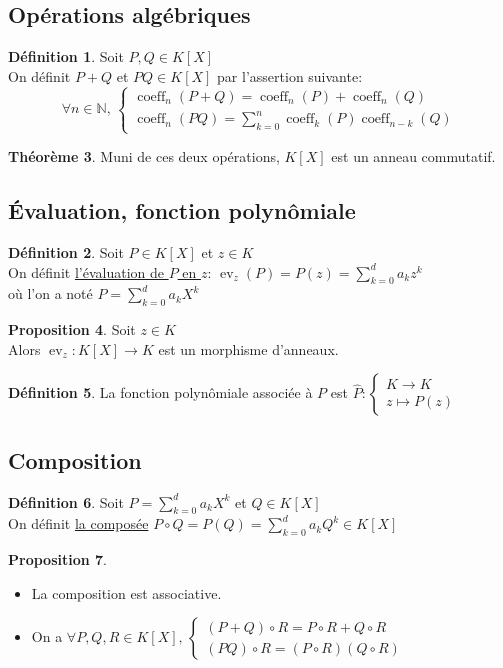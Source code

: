\documentclass[10pt,a4paper]{article}
\theoremstyle{definition}
\newtheorem{proposition}{Proposition}[section]
\newtheorem{theorem}[proposition]{Théorème}
\newtheorem{definition}[proposition]{Définition}
\DeclareMathOperator{\coeff}{coeff}
\DeclareMathOperator{\ev}{ev}
\begin{document}
\subsection{Opérations algébriques}
\begin{definition}
Soit $P, Q \in K[X]$ \\
On définit $P + Q$ et $PQ \in K[X]$ par l'assertion suivante:
\[ \forall n \in \mathbb{N},\, \begin{cases}
\coeff_n(P + Q) = \coeff_n(P) + \coeff_n(Q) \\
\coeff_n(PQ) = \sum\limits_{k = 0}^n \coeff_k(P) \coeff_{n - k}(Q)
\end{cases}\]
\end{definition}
\begin{theorem}
Muni de ces deux opérations, $K[X]$ est un anneau commutatif.

\subsection{Évaluation, fonction polynômiale}
\begin{definition}
Soit $P \in K[X]$ et $z \in K$ \\
On définit \uline{l'évaluation de $P$ en $z$}: $\ev_z(P) = P(z) = \sum\limits_{k = 0}^d a_k z^k$ \\
où l'on a noté $P = \sum\limits_{k = 0}^d a_k X^k$
\end{definition}
\end{theorem}
\begin{proposition}
Soit $z \in K$ \\
Alors $\ev_z: K[X] \to K$ est un morphisme d'anneaux.
\end{proposition}
\begin{definition}
La fonction polynômiale associée à $P$ est $\widehat{P}: \begin{cases}
K \to K \\
z \mapsto P(z)
\end{cases}$
\end{definition}

\subsection{Composition}
\begin{definition}
Soit $P = \sum\limits_{k = 0}^d a_k X^k$ et $Q \in K[X]$ \\
On définit \uline{la composée} $P \circ Q = P(Q) = \sum\limits_{k = 0}^d a_k Q^k \in K[X]$
\end{definition}
\begin{proposition}
\hfill
\begin{itemize}
\item La composition est associative.
\item On a $\forall P, Q, R \in K[X],\, \begin{cases}
(P + Q) \circ R = P \circ R + Q \circ R \\
(PQ) \circ R = (P \circ R)(Q \circ R)
\end{cases}$
\end{itemize}
\end{proposition}
\end{document}
